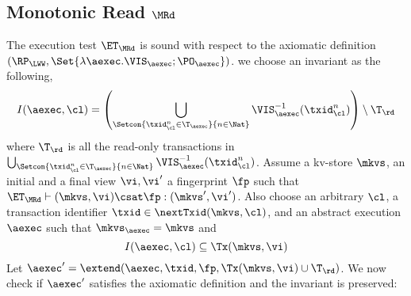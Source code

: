 \subsection{Monotonic Read \( \MRd \)}
\label{sec:sound-complete-mr}

The execution test $\ET_\MRd$ is sound with respect to the axiomatic definition $(\RP_{\LWW}, \Set{\lambda \aexec. \VIS_{\aexec} ; \PO_{\aexec} })$. 
we choose an invariant as the following,  
\[
    I(\aexec, \cl) = \left( \bigcup_{\Setcon{\txid_{\cl}^{n} \in \T_{\aexec} }{ n \in \Nat}} \VIS_{\aexec}^{-1}(\txid^n_\cl) \right) \setminus \T_\rd
\]
where \( \T_\rd \) is all the read-only transactions in 
\( \bigcup_{\Setcon{\txid_{\cl}^{n} \in \T_{\aexec} }{ n \in \Nat}} \VIS_{\aexec}^{-1}(\txid^n_\cl) \).
Assume a kv-store $\mkvs$, an initial and a final view $\vi, \vi'$  a fingerprint $\fp$ 
such that $\ET_{\MRd} \vdash (\mkvs, \vi) \csat \fp: (\mkvs',\vi')$. 
Also choose an arbitrary $\cl$, a transaction identifier $\txid \in \nextTxid(\mkvs, \cl)$, 
and an abstract execution $\aexec$ such that $\mkvs_{\aexec} = \mkvs$ and 
\begin{equation}
I(\aexec, \cl) \subseteq \Tx(\mkvs, \vi)
\label{eq:mr_invariant}
\end{equation}
Let \( \aexec' = \extend(\aexec, \txid, \fp, \Tx(\mkvs, \vi) \cup \T_\rd) \).
We now check if \( \aexec' \) satisfies the axiomatic definition and the invariant is preserved:
